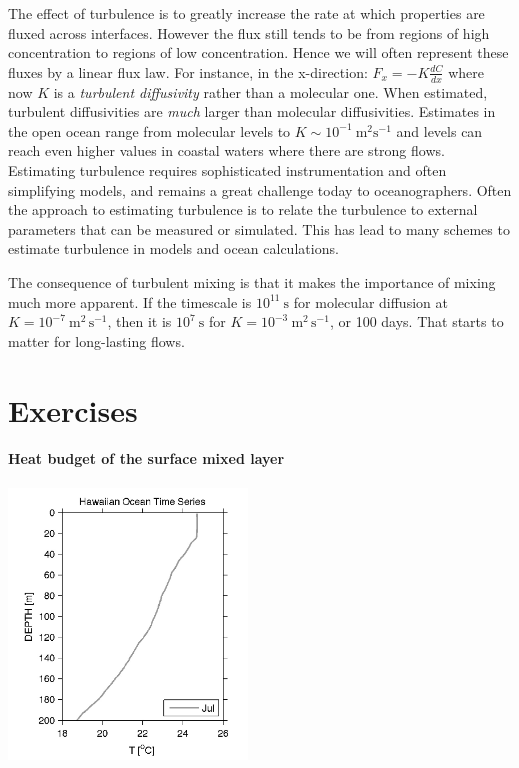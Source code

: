 The effect of turbulence is to greatly increase the rate at which properties are fluxed across interfaces.  However the flux still tends to be from regions of high concentration to regions of low concentration.  Hence we will often represent these fluxes by a linear flux law.  For instance, in the x-direction: $F_x = -K \frac{dC}{dx}$ where now $K$ is a \emph{turbulent diffusivity} rather than a molecular one.  When estimated, turbulent diffusivities are \emph{much} larger than molecular diffusivities.  Estimates in the open ocean range from molecular levels to $K\sim 10^{-1}\ \mathrm{m^2s^{-1}}$ and levels can reach even higher values in coastal waters where there are strong flows.  Estimating turbulence requires sophisticated instrumentation and often simplifying models, and remains a great challenge today to oceanographers.  Often the approach to estimating turbulence is to relate the turbulence to external parameters that can be measured or simulated.  This has lead to many schemes to estimate turbulence in models and ocean calculations.  

The consequence of turbulent mixing is that it makes the importance of mixing much more apparent.  If the timescale is $10^{11}\ \mathrm{s}$ for molecular diffusion at $K=10^{-7}\ \mathrm{m^2\,s^{-1}}$, then it is $10^{7}\ \mathrm{s}$ for $K=10^{-3}\ \mathrm{m^2\,s^{-1}}$, or 100 days.  That starts to matter for long-lasting flows.  

\section{Exercises}

\paragraph{Heat budget of the surface mixed layer}

\includegraphics[width=2.5in]{figs/FluxesFigs/HotsT}

